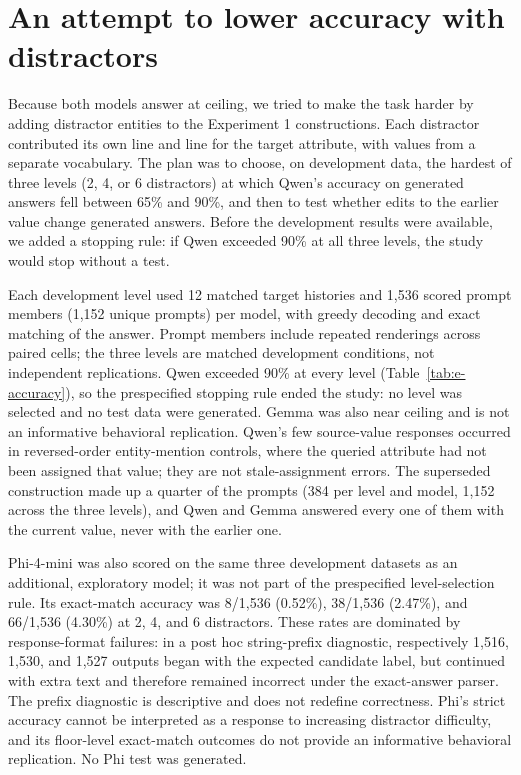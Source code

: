 \section{An attempt to lower accuracy with distractors}
\label{app:harder}

Because both models answer at ceiling, we tried to make the task harder by adding distractor entities to the Experiment 1 constructions. Each distractor contributed its own  line and  line for the target attribute, with values from a separate vocabulary. The plan was to choose, on development data, the hardest of three levels (2, 4, or 6 distractors) at which Qwen's accuracy on generated answers fell between 65\% and 90\%, and then to test whether edits to the earlier value change generated answers. Before the development results were available, we added a stopping rule: if Qwen exceeded 90\% at all three levels, the study would stop without a test.

Each development level used 12 matched target histories and 1,536 scored prompt members (1,152 unique prompts) per model, with greedy decoding and exact matching of the answer. Prompt members include repeated renderings across paired cells; the three levels are matched development conditions, not independent replications. Qwen exceeded 90\% at every level (Table~\ref{tab:e-accuracy}), so the prespecified stopping rule ended the study: no level was selected and no test data were generated. Gemma was also near ceiling and is not an informative behavioral replication. Qwen's few source-value responses occurred in reversed-order entity-mention controls, where the queried attribute had not been assigned that value; they are not stale-assignment errors. The superseded construction made up a quarter of the prompts (384 per level and model, 1,152 across the three levels), and Qwen and Gemma answered every one of them with the current value, never with the earlier one.

Phi-4-mini was also scored on the same three development datasets as an additional, exploratory model; it was not part of the prespecified level-selection rule. Its exact-match accuracy was 8/1,536 (0.52\%), 38/1,536 (2.47\%), and 66/1,536 (4.30\%) at 2, 4, and 6 distractors. These rates are dominated by response-format failures: in a post hoc string-prefix diagnostic, respectively 1,516, 1,530, and 1,527 outputs began with the expected candidate label, but continued with extra text and therefore remained incorrect under the exact-answer parser. The prefix diagnostic is descriptive and does not redefine correctness. Phi's strict accuracy cannot be interpreted as a response to increasing distractor difficulty, and its floor-level exact-match outcomes do not provide an informative behavioral replication. No Phi test was generated.


